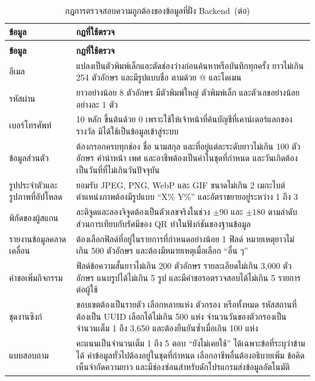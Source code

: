 \begin{longtable}{|p{3.4cm}|p{9.3cm}|}
\caption{กฎการตรวจสอบความถูกต้องของข้อมูลที่ฝั่ง Backend}\label{tab:validation_rules}\\
\hline
\textbf{ข้อมูล} & \textbf{กฎที่ใช้ตรวจ} \\
\hline
\endfirsthead
\caption[]{กฎการตรวจสอบความถูกต้องของข้อมูลที่ฝั่ง Backend~(\textnormal{ต่อ})}\\
\hline
\textbf{ข้อมูล} & \textbf{กฎที่ใช้ตรวจ} \\
\hline
\endhead
อีเมล & แปลงเป็นตัวพิมพ์เล็กและตัดช่องว่างก่อนค้นหาหรือบันทึกทุกครั้ง ยาวไม่เกิน 254 ตัวอักษร และมีรูปแบบชื่อ ตามด้วย @ และโดเมน \\ \hline
รหัสผ่าน & ยาวอย่างน้อย 8 ตัวอักษร มีตัวพิมพ์ใหญ่ ตัวพิมพ์เล็ก และตัวเลขอย่างน้อยอย่างละ 1 ตัว \\ \hline
เบอร์โทรศัพท์ & 10 หลัก ขึ้นต้นด้วย 0 เพราะใช้ให้เจ้าหน้าที่ค้นบัญชีที่เคาน์เตอร์แลกของรางวัล มิได้ใช้เป็นข้อมูลเข้าสู่ระบบ \\ \hline
ข้อมูลส่วนตัว & ต้องกรอกครบทุกช่อง ชื่อ นามสกุล และที่อยู่แต่ละระดับยาวไม่เกิน 100 ตัวอักษร คำนำหน้า เพศ และอาชีพต้องเป็นค่าในชุดที่กำหนด และวันเกิดต้องเป็นวันที่ที่ไม่เกินวันปัจจุบัน \\ \hline
รูปประจำตัวและรูปภาพที่อัปโหลด & ยอมรับ JPEG, PNG, WebP และ GIF ขนาดไม่เกิน 2 เมกะไบต์ ตำแหน่งภาพต้องมีรูปแบบ ``X\% Y\%'' และอัตราขยายอยู่ระหว่าง 1 ถึง 3 \\ \hline
พิกัดของผู้สแกน & ละติจูดและลองจิจูดต้องเป็นตัวเลขจริงในช่วง $\pm 90$ และ $\pm 180$ ตามลำดับ ส่วนการเทียบกับรัศมีของ QR ทำในฟังก์ชันของฐานข้อมูล \\ \hline
รายงานข้อมูลคลาดเคลื่อน & ต้องเลือกฟิลด์ที่อยู่ในรายการที่กำหนดอย่างน้อย 1 ฟิลด์ หมายเหตุยาวไม่เกิน 500 ตัวอักษร และต้องมีหมายเหตุเมื่อเลือก ``อื่น ๆ'' \\ \hline
คำขอเพิ่มกิจกรรม & ฟิลด์ข้อความสั้นยาวไม่เกิน 200 ตัวอักษร รายละเอียดไม่เกิน 3,000 ตัวอักษร แนบรูปได้ไม่เกิน 5 รูป และมีคำขอรอตรวจสอบได้ไม่เกิน 5 รายการต่อผู้ใช้ \\ \hline
ชุดงานซิงก์ & ขอบเขตต้องเป็นรายตัว เลือกหลายแห่ง ตัวกรอง หรือทั้งหมด รหัสสถานที่ต้องเป็น UUID เลือกได้ไม่เกิน 500 แห่ง จำนวนวันของตัวกรองเป็นจำนวนเต็ม 1 ถึง 3,650 และต้องยืนยันซ้ำเมื่อเกิน 100 แห่ง \\ \hline
แบบสอบถาม & คะแนนเป็นจำนวนเต็ม 1 ถึง 5 ตอบ ``ยังไม่เคยใช้'' ได้เฉพาะข้อที่ระบุว่าข้ามได้ ค่าข้อมูลทั่วไปต้องอยู่ในชุดที่กำหนด เลือกอาชีพอื่นต้องอธิบายเพิ่ม ข้อคิดเห็นจำกัดความยาว และมีช่องซ่อนสำหรับดักโปรแกรมส่งข้อมูลอัตโนมัติ \\
\hline
\end{longtable}

